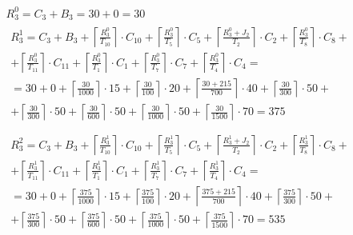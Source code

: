 \begin{gather*}
  R_3^0 = C_3 + B_3 = 30 + 0 = 30 \\
  \begin{multlined}
    R_3^1 = C_3 + B_3 + \left\lceil\frac{R_3^0}{T_{10}}\right\rceil\cdot C_{10} + %
    \left\lceil\frac{R_3^0}{T_5}\right\rceil\cdot C_5 + %
    \left\lceil\frac{R_3^0 + J_2}{T_2}\right\rceil\cdot C_2 + %
    \left\lceil\frac{R_3^0}{T_8}\right\rceil\cdot C_8 + \\%
    + \left\lceil\frac{R_3^0}{T_{11}}\right\rceil\cdot C_{11} + %
    \left\lceil\frac{R_3^0}{T_1}\right\rceil\cdot C_1 +%
    \left\lceil\frac{R_3^0}{T_7}\right\rceil\cdot C_7 +%
    \left\lceil\frac{R_3^0}{T_4}\right\rceil\cdot C_4 = \\%
    = 30 + 0 + \left\lceil\frac{30}{1000}\right\rceil\cdot 15 + %
    \left\lceil\frac{30}{100}\right\rceil\cdot 20 + %
    \left\lceil\frac{30 + 215}{700}\right\rceil\cdot 40 + %
    \left\lceil\frac{30}{300}\right\rceil\cdot 50 + \\%
    + \left\lceil\frac{30}{300}\right\rceil\cdot 50 + %
    \left\lceil\frac{30}{600}\right\rceil\cdot 50 + %
    \left\lceil\frac{30}{1000}\right\rceil\cdot 50 +%
    \left\lceil\frac{30}{1500}\right\rceil\cdot 70 = 375 \\
  \end{multlined} \\
  \begin{multlined}
    R_3^2 = C_3 + B_3 + \left\lceil\frac{R_3^1}{T_{10}}\right\rceil\cdot C_{10} + %
    \left\lceil\frac{R_3^1}{T_5}\right\rceil\cdot C_5 + %
    \left\lceil\frac{R_3^1 + J_2}{T_2}\right\rceil\cdot C_2 + %
    \left\lceil\frac{R_3^1}{T_8}\right\rceil\cdot C_8 + \\%
    + \left\lceil\frac{R_3^1}{T_{11}}\right\rceil\cdot C_{11} + %
    \left\lceil\frac{R_3^1}{T_1}\right\rceil\cdot C_1 +%
    \left\lceil\frac{R_3^1}{T_7}\right\rceil\cdot C_7 +%
    \left\lceil\frac{R_3^1}{T_4}\right\rceil\cdot C_4 = \\%
    = 30 + 0 + \left\lceil\frac{375}{1000}\right\rceil\cdot 15 + %
    \left\lceil\frac{375}{100}\right\rceil\cdot 20 + %
    \left\lceil\frac{375 + 215}{700}\right\rceil\cdot 40 + %
    \left\lceil\frac{375}{300}\right\rceil\cdot 50 + \\%
    + \left\lceil\frac{375}{300}\right\rceil\cdot 50 + %
    \left\lceil\frac{375}{600}\right\rceil\cdot 50 + %
    \left\lceil\frac{375}{1000}\right\rceil\cdot 50 +%
    \left\lceil\frac{375}{1500}\right\rceil\cdot 70 = 535 \\

\end{multlined}
\end{gather*}
